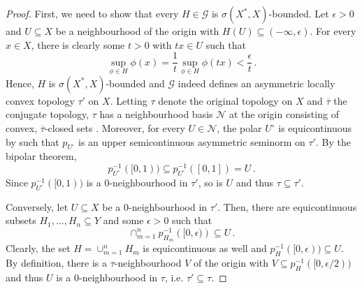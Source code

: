 \documentclass[
	paper=A4,
	pagesize=auto,
	fontsize=12pt
]{scrartcl}
\theoremstyle{plain}
\theoremstyle{remark}
\theoremstyle{definition}
\begin{document}
\begin{proof}
First, we need to show that every $H \in \mathcal{G}$ is $\sigma(X^*, X)$-bounded.
Let $\epsilon > 0$ and $U \subseteq X$ be a neighbourhood of the origin with $H(U) \subseteq ( -\infty, \epsilon )$.
For every $x \in X$, there is clearly some $t > 0$ with $t x \in U$ such that
%
\begin{equation}
\sup_{\phi \in H} \phi \left( x \right)
=
\frac{1}{t} \sup_{\phi \in H} \phi \left( t x \right)
<
\frac{\epsilon}{t} \, .
\end{equation}
%
Hence, $H$ is $\sigma(X^*, X)$-bounded and $\mathcal{G}$ indeed defines an asymmetric locally convex topology $\tau'$ on $X$.
Letting $\tau$ denote the original topology on $X$ and $\overline{\tau}$ the conjugate topology, $\tau$ has a neighbourhood basis $\mathcal{N}$ at the origin consisting of convex, $\overline{\tau}$-closed sets \cite[Section 1.1.7]{src:Cobzaş:FunctionalAnalysisinAsymmetricNormedSpaces}.
Moreover, for every $U \in \mathcal{N}$, the polar $U^\circ$ is equicontinuous by  such that $p_{U^\circ}$ is an upper semicontinuous asymmetric seminorm on $\tau'$.
By the bipolar theorem, 
%
\begin{equation}
p_{U^\circ}^{-1}([0, 1))
\subseteq
p_{U^\circ}^{-1}([0, 1])
=
U \, .
\end{equation}
%
Since $p_{U^\circ}^{-1}([0, 1))$ is a $0$-neighbourhood in $\tau'$, so is $U$ and thus $\tau \subseteq \tau'$.

Conversely, let $U \subseteq X$ be a $0$-neighbourhood in $\tau'$.
Then, there are equicontinuous subsets $H_1, \dots, H_n \subseteq Y$ and some $\epsilon > 0$ such that
%
\begin{equation}
\cap_{m = 1}^n p_{H_m}^{-1} \left( [0, \epsilon ) \right)
\subseteq
U \, .
\end{equation}
%
Clearly, the set $H = \cup_{m = 1}^n H_m$ is equicontinuous as well and $p_H^{-1}([0, \epsilon)) \subseteq U$.
By definition, there is a $\tau$-neighbourhood $V$ of the origin with $V \subseteq p_H^{-1}([0, \epsilon / 2))$ and thus $U$ is a $0$-neighbourhood in $\tau$, i.e. $\tau' \subseteq \tau$.
\end{proof}
%
\end{document}
